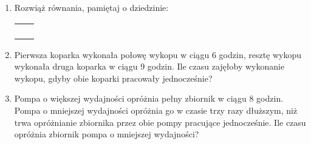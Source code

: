 \documentclass[12pt,a4paper]{article}
\begin{document}
\begin{enumerate}[1.]
\normalsize
\item Rozwiąż równania, pamiętaj o dziedzinie:
\Large
\begin{enumerate}[a)] \begin{tabular}{p{7cm} p{7cm}} 
		\item $\frac{x+1}{x-5}=\frac{x-2}{x+1} $& \vspace{0.4cm} \item $\frac{2x+3}{4x-5}=\frac{4x+5}{8x-7} $ \\
		\item $\frac{x^3-2x^2-5x+10}{2x-10}=0 $& \item $\frac{x^2+5}{3x^2-6x}=0 $ \\
		\item $\frac{3}{x^2-4}=1 $& \item $\frac{2x+3}{4x-5}=\frac{4x+5}{8x-7} $ \\
		\item $\frac{x}{x-3}+\frac{4}{x-3}=2x-2 $& \item $\frac{x+1}{x-3}+\frac{x-2}{x+1}=\frac{x^2+x+12}{x^2-2x-3} $  \\
\end{tabular} \end{enumerate}	

\normalsize
\item Pierwsza koparka wykonała połowę wykopu w ciągu 6 godzin, resztę wykopu wykonała druga koparka w ciągu 9 godzin. Ile czasu zajęłoby wykonanie wykopu, gdyby obie koparki pracowały jednocześnie?

\item Pompa o większej wydajności opróżnia pełny zbiornik w ciągu 8 godzin. Pompa o mniejszej wydajności opróżnia go w czasie trzy razy dłuższym, niż trwa opróżnianie zbiornika przez obie pompy pracujące jednocześnie. Ile czasu opróżnia zbiornik pompa o mniejszej wydajności?


		
	\end{enumerate}
\end{document}
